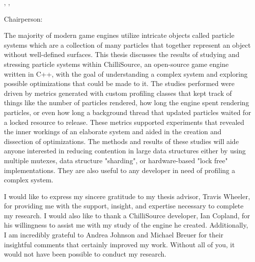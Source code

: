 
\noindent \melastfirst, \mycurrentdegreeabbrev, \mygradmonth \ \ \mygradyear
\makebox[3.5in][r]{\mymajordept}
\vskip 11pt
\noindent \mytitle

\vskip 11pt

\noindent Chairperson: \chairname

\begin{singlespace}

The majority of modern game engines utilize intricate objects called particle systems which are a collection of many particles that together represent an object without well-defined surfaces. This thesis discusses the results of studying and stressing particle systems within ChilliSource, an open-source game engine written in C++, with the goal of understanding a complex system and exploring possible optimizations that could be made to it. The studies performed were driven by metrics generated with custom profiling classes that kept track of things like the number of particles rendered, how long the engine spent rendering particles, or even how long a background thread that updated particles waited for a locked resource to release. These metrics supported experiments that revealed the inner workings of an elaborate system and aided in the creation and dissection of optimizations. The methods and results of these studies will aide anyone interested in reducing contention in large data structures either by using multiple mutexes, data structure "sharding", or hardware-based "lock free" implementations. They are also useful to any developer in need of profiling a complex system.

\end{singlespace}

\newpage


I would like to express my sincere gratitude to my thesis advisor, Travis Wheeler, for providing me with the support, insight, and expertise necessary to complete my research. I would also like to thank a ChilliSource developer, Ian Copland, for his willingness to assist me with my study of the engine he created. Additionally, I am incredibly grateful to Andrea Johnson and Michael Breuer for their insightful comments that certainly improved my work. Without all of you, it would not have been possible to conduct my research. 

